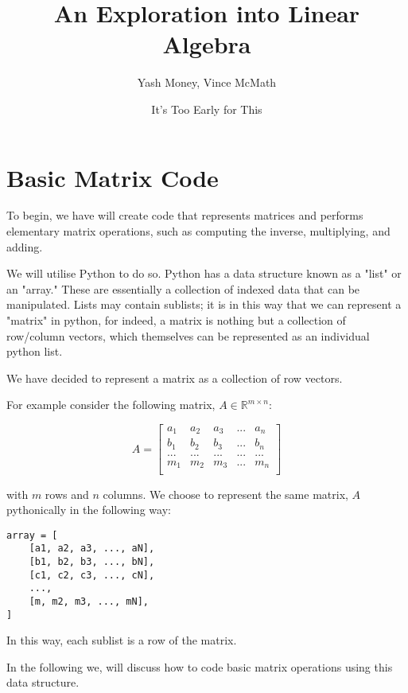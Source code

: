 \documentclass[12pt, a4paper]{article}
\title{An Exploration into Linear Algebra}
\author{Yash Money, Vince McMath}
\date{It's Too Early for This}
\begin{document}
\maketitle

\section{Basic Matrix Code}

To begin, we have will create code that represents matrices and
performs elementary matrix operations, such as computing the inverse, 
multiplying, and adding. 

We will utilise Python to do so. Python has a data structure known as a "list" or an "array."
These are essentially a collection of indexed data that can be manipulated. Lists may contain sublists; it is in this way
that we can represent a "matrix" in python, for indeed, a matrix is nothing but a collection of row/column vectors, which themselves
can be represented as an individual python list. 

We have decided to represent a matrix as a collection of row vectors.

For example consider the following matrix, $ A \in \mathbb{R}^{m\times n} $: 

\begin{equation*}
    A =
\begin{bmatrix}
a_{1}  & a_{2} & a_{3} & ... & a_{n}\\
b_{1}  & b_{2} & b_{3} & ... & b_{n}\\
...  & ...& ... & ... & ...\\
m_{1}  & m_{2} & m_{3} & ... & m_{n}\\
\end{bmatrix}
\end{equation*}

with $m$ rows and $n$ columns. We choose to represent the same matrix, $A$ pythonically in the following way: \newline

\begin{lstlisting}
array = [
    [a1, a2, a3, ..., aN],
    [b1, b2, b3, ..., bN],
    [c1, c2, c3, ..., cN],
    ...,
    [m, m2, m3, ..., mN],
]    
\end{lstlisting}

In this way, each sublist is a row of the matrix. 

In the following we, will discuss how to code basic matrix operations using this data structure.
\end{document}
